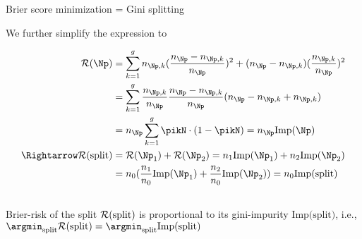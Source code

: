 \documentclass[11pt,compress,t,notes=noshow, xcolor=table]{beamer}
\begin{document}
\begin{frame2}[footnotesize]{Brier score minimization = Gini splitting}

We further simplify the expression to

\begin{align*}
\risk(\Np) &=  \sum_{k = 1}^g n_{\Np,k}(\frac{n_{\Np } - n_{\Np,k}}{n_{\Np }})^2 + (n_{\Np } - n_{\Np,k})(\frac{n_{\Np,k}}{n_{\Np }})^2 \\
&= \sum_{k = 1}^g \frac{n_{\Np,k}}{n_{\Np }} \frac{n_{\Np } - n_{\Np,k}}{n_{\Np }} (n_{\Np } - n_{\Np,k } + n_{\Np,k}) \\
&= n_{\Np } \sum_{k = 1}^g \pikN \cdot (1 - \pikN ) = n_\Np \text{Imp}(\Np)\\
 \Rightarrow \risk(\text{split}) &= \risk(\Np_1) + \risk(\Np_2)  = n_1 \text{Imp}(\Np_1) + n_2 \text{Imp}(\Np_2)\\
 &=n_0 (\frac{n_1}{n_0} \text{Imp}(\Np_1) + \frac{n_2}{n_0} \text{Imp}(\Np_2)) = n_0\text{Imp(split)}\\
\
\end{align*} 
Brier-risk of the split $\mathcal{R}(\text{split})$ is proportional to its gini-impurity $\text{Imp(split)}$, i.e., $\argmin_\text{split} \risk(\text{split}) = \argmin_\text{split} \text{Imp(split)}$\\

\end{frame2}


\endlecture
\end{document}
